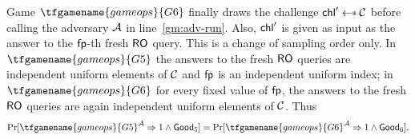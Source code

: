 Game $\tfgamename{gameops}{G6}$ finally draws the challenge $\chall' \sample \cC$ before calling the adversary $\mathcal{A}$ in line~\ref{gm:adv-run}. 
Also, $\mathsf{chl}'$ is given as input as the answer to the $\mathsf{fp}$-th fresh $\mathsf{RO}$ query. 
This is a change of sampling order only.
In $\tfgamename{gameops}{G5}$ the answers to the fresh $\mathsf{RO}$ queries are independent uniform elements of $\mathcal{C}$ and $\mathsf{fp}$ is an independent uniform index; in $\tfgamename{gameops}{G6}$ for every fixed value of $\mathsf{fp}$, the answers to the fresh $\mathsf{RO}$ queries are again independent uniform elements of $\mathcal{C}$. 
Thus
\begin{equation}\label{eq:g5g6}
    \Pr[\tfgamename{gameops}{G5}^\adv \Rightarrow 1 \wedge \goodev_5]
    = \Pr[\tfgamename{gameops}{G6}^\adv \Rightarrow 1 \wedge \goodev_6].
\end{equation}
